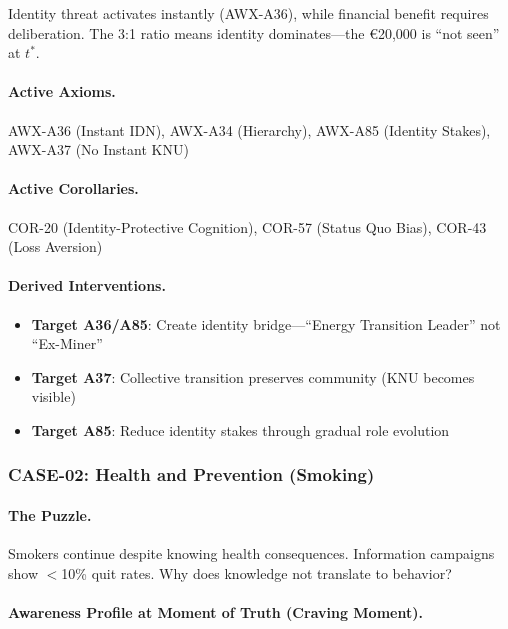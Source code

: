 Identity threat activates instantly (AWX-A36), while financial benefit requires deliberation. The 3:1 ratio means identity dominates---the \euro{20,000} is ``not seen'' at $t^*$.

\paragraph{Active Axioms.} AWX-A36 (Instant IDN), AWX-A34 (Hierarchy), AWX-A85 (Identity Stakes), AWX-A37 (No Instant KNU)

\paragraph{Active Corollaries.} COR-20 (Identity-Protective Cognition), COR-57 (Status Quo Bias), COR-43 (Loss Aversion)

\paragraph{Derived Interventions.}
\begin{itemize}
    \item \textbf{Target A36/A85}: Create identity bridge---``Energy Transition Leader'' not ``Ex-Miner''
    \item \textbf{Target A37}: Collective transition preserves community (KNU becomes visible)
    \item \textbf{Target A85}: Reduce identity stakes through gradual role evolution
\end{itemize}


\subsubsection{CASE-02: Health and Prevention (Smoking)}

\paragraph{The Puzzle.}
Smokers continue despite knowing health consequences. Information campaigns show $<$10\% quit rates. Why does knowledge not translate to behavior?

\paragraph{Awareness Profile at Moment of Truth (Craving Moment).}

